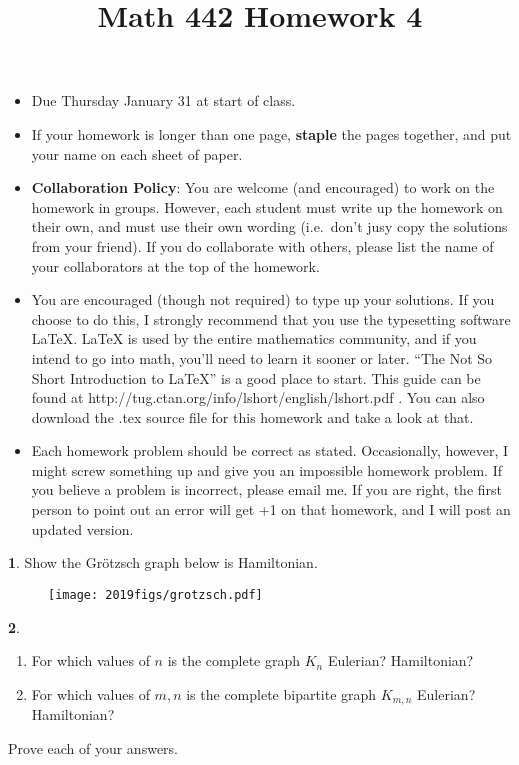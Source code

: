 \documentclass[12pt]{article}
\title{\vspace{-2.0cm}Math 442 Homework 4}
\date{}
\theoremstyle{definition}
\newtheorem{problem}{}
\begin{document}
%
%
\maketitle
%
\vspace{-16 mm}
\begin{itemize}
\item Due Thursday January 31 at start of class.
%
\item If your homework is longer than one page, {\bf staple} the pages together, and put your name on each sheet of paper.
%
\item {\bf Collaboration Policy}: You are welcome (and encouraged) to work on the homework in groups. However, each student must write up the homework on their own, and must use their own wording (i.e.~don't jusy copy the solutions from your friend). If you do collaborate with others, please list the name of your collaborators at the top of the homework.

\item You are encouraged (though not required) to type up your solutions. If you choose to do this, I strongly recommend that you use the typesetting software LaTeX. LaTeX is used by the entire mathematics community, and if you intend to go into math, you’ll need to learn it sooner or later. ``The Not So Short Introduction to LaTeX'' is a good place to start. This guide can be found at http://tug.ctan.org/info/lshort/english/lshort.pdf . You can also download the .tex source file for this homework and take a look at that.

\item Each homework problem should be correct as stated. Occasionally, however, I might screw something up and give you an impossible homework problem. If you believe a problem is incorrect, please email me. If you are right, the first person to point out an error will get +1 on that homework, and I will post an updated version. 
\end{itemize}
\begin{problem}
 Show the Gr\"otzsch graph below is Hamiltonian.

\begin{figure}[h]\centerline{\texttt{[image: 2019figs/grotzsch.pdf]}}
\end{figure}
\end{problem}

\begin{problem}
\begin{enumerate}
\item For which values of $n$ is the complete graph $K_n$ Eulerian? Hamiltonian?\item For which values of $m, n$ is the complete bipartite graph $K_{m,n}$ Eulerian? Hamiltonian?\end{enumerate}

Prove each of your answers.
\end{problem}
\end{document}
